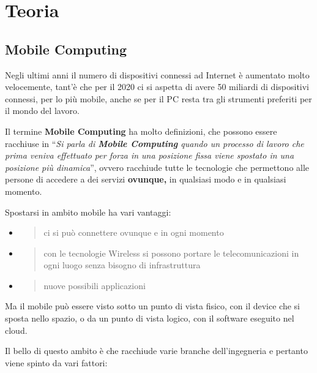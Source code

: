\part{Teoria}

\chapter{Mobile Computing}
\label{mobile-computing}

Negli ultimi anni il numero di dispositivi connessi ad Internet è
aumentato molto velocemente, tant'è che per il 2020 ci si aspetta di
avere 50 miliardi di dispositivi connessi, per lo più mobile, anche se
per il PC resta tra gli strumenti preferiti per il mondo del lavoro.

Il termine \textbf{Mobile Computing} ha molto definizioni, che possono
essere racchiuse in ``\emph{Si parla di \textbf{Mobile Computing} quando
un processo di lavoro che prima veniva effettuato per forza in una
posizione fissa viene spostato in una posizione più dinamica}'', ovvero
racchiude tutte le tecnologie che permettono alle persone di accedere a
dei servizi \textbf{ovunque,} in qualsiasi modo e in qualsiasi momento.

Spostarsi in ambito mobile ha vari vantaggi:

\begin{itemize}
\item
  \begin{quote}
  ci si può connettere ovunque e in ogni momento
  \end{quote}
\item
  \begin{quote}
  con le tecnologie Wireless si possono portare le telecomunicazioni in
  ogni luogo senza bisogno di infrastruttura
  \end{quote}
\item
  \begin{quote}
  nuove possibili applicazioni
  \end{quote}
\end{itemize}

Ma il mobile può essere visto sotto un punto di vista fisico, con il
device che si sposta nello spazio, o da un punto di vista logico, con il
software eseguito nel cloud.

Il bello di questo ambito è che racchiude varie branche dell'ingegneria
e pertanto viene spinto da vari fattori:

